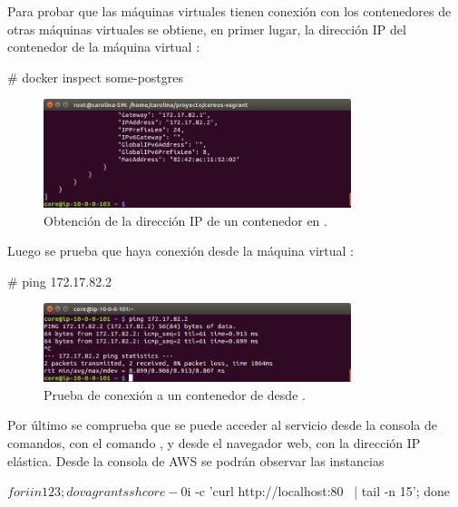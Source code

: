 Para probar que las máquinas virtuales tienen conexión con los contenedores de otras máquinas virtuales se obtiene, en primer lugar, la dirección IP del contenedor  de la máquina virtual :

\begin{code}
# docker inspect some-postgres
\end{code}

\begin{figure}[H]
\centering
\includegraphics[width=0.8\textwidth]{images/figures/docker-inspect-3.png}
\caption{Obtención de la dirección IP de un contenedor en .}
\end{figure}

Luego se prueba que haya conexión desde la máquina virtual :

\begin{code}
# ping 172.17.82.2
\end{code}

\begin{figure}[H]
\centering
\includegraphics[width=0.8\textwidth]{images/figures/ping-1.png}
\caption{Prueba de conexión a un contenedor de  desde .}
\end{figure}

Por último se comprueba que se puede acceder al servicio desde la consola de comandos, con el comando , y desde el navegador web, con la dirección IP elástica. Desde la consola de AWS se podrán observar las instancias  

\begin{code}
$ for i in 1 2 3; do vagrant ssh core-0$i -c 'curl http://localhost:80 \
  | tail -n 15'; done
\end{code}

